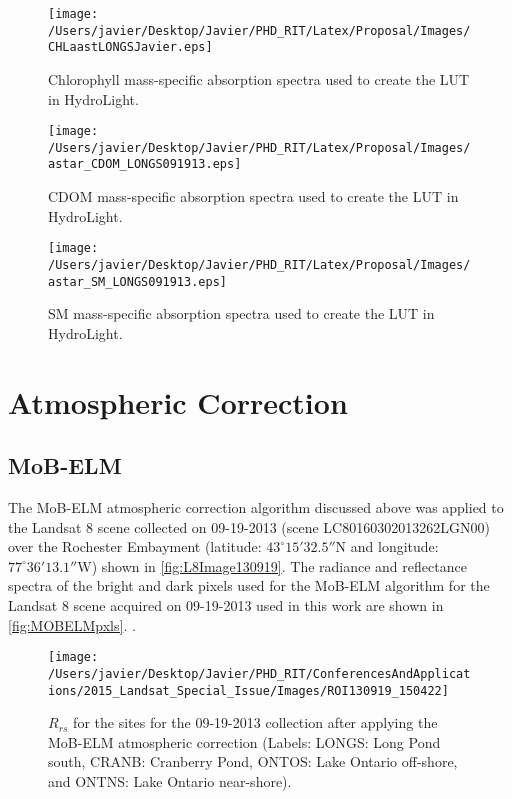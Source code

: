 \begin{figure}[htb]
    \centering
    \texttt{[image: /Users/javier/Desktop/Javier/PHD\_RIT/Latex/Proposal/Images/CHLaastLONGSJavier.eps]}
  \caption{Chlorophyll mass-specific absorption spectra used to create the LUT in HydroLight. \label{fig:CHLaastLONGS} } 
\end{figure}


\begin{figure}[htb]
    \centering
    \texttt{[image: /Users/javier/Desktop/Javier/PHD\_RIT/Latex/Proposal/Images/astar\_CDOM\_LONGS091913.eps]}
  \caption{CDOM mass-specific absorption spectra used to create the LUT in HydroLight. \label{fig:CDOMaastLONGS} } 
\end{figure}

\begin{figure}[htb]
    \centering
    \texttt{[image: /Users/javier/Desktop/Javier/PHD\_RIT/Latex/Proposal/Images/astar\_SM\_LONGS091913.eps]}
  \caption{SM mass-specific absorption spectra used to create the LUT in HydroLight. \label{fig:SMaastLONGS} } 
\end{figure}

\section{Atmospheric Correction}
\subsection{MoB-ELM}

The MoB-ELM atmospheric correction algorithm discussed above was applied to the Landsat 8 scene collected on 09-19-2013 (scene LC80160302013262LGN00) over the Rochester Embayment (latitude: $43^\circ15'32.5''$N and longitude: $77^\circ36'13.1''$W) shown in \autoref{fig:L8Image130919}. The radiance and reflectance spectra of the bright and dark pixels used for the MoB-ELM algorithm for the Landsat 8 scene acquired on 09-19-2013 used in this work are shown in \autoref{fig:MOBELMpxls}. . 

\begin{figure}[htbp!]
  \centering
  \texttt{[image: /Users/javier/Desktop/Javier/PHD\_RIT/ConferencesAndApplications/2015\_Landsat\_Special\_Issue/Images/ROI130919\_150422]}
  \caption{$R_{rs}$ for the sites for the 09-19-2013 collection after applying the MoB-ELM atmospheric correction (Labels: LONGS: Long Pond south, CRANB: Cranberry Pond, ONTOS: Lake Ontario off-shore, and ONTNS: Lake Ontario near-shore).\label{fig:RrsROIs130919} } 
\end{figure}

